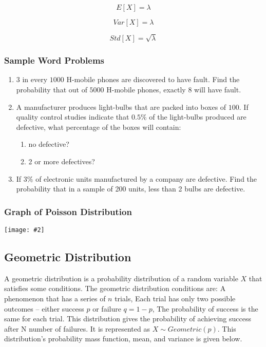 \documentclass[a4paper]{article}
\newcommand*{\newincludegraphics}[2][]{
    \begin{center}
        \begin{adjustbox}{max size={\textwidth}{\textheight}}
            \texttt{[image: \#2]}
        \end{adjustbox}
    \end{center}
}
\begin{document}
    \begin{equation}
        \label{eq:poisson_mean}
        E[X] = \lambda
    \end{equation}

    \begin{equation}
        \label{eq:poisson_variance}
        Var[X] = \lambda
    \end{equation}

    \begin{equation}
        \label{eq:poisson_std}
        Std[X] = \sqrt{\lambda}
    \end{equation}

    \subsubsection*{Sample Word Problems}
    \begin{enumerate}
        \item $3$ in every $1000$ H-mobile phones are discovered to have fault. Find the probability that out of $5000$ H-mobile phones, exactly 8 will have fault.
        \item A manufacturer produces light-bulbs that are packed into boxes of $100$. If quality control studies indicate that $0.5\%$ of the light-bulbs produced are defective, what percentage of the boxes will contain:
            \begin{enumerate}
                \item no defective?
                \item 2 or more defectives?
            \end{enumerate}
        \item If $3\%$ of electronic units manufactured by a company are defective. Find the probability that in a sample of 200 units, less than 2 bulbs are defective.
    \end{enumerate}

    \subsubsection*{Graph of Poisson Distribution}
    \newincludegraphics[]{(D)-Poisson_distribution_visualization}

    \subsection{Geometric Distribution}
    A geometric distribution is a probability distribution of a random variable $X$ that satisfies some conditions. The geometric distribution conditions are: A phenomenon that has a series of $n$ trials, Each trial has only two possible outcomes – either success $p$ or failure $q = 1-p$, The probability of success is the same for each trial. This distribution gives the probability of achieving success after N number of failures. It is represented as $X \sim Geometric(p)$. This distribution's probability mass function, mean, and variance is given below.
\end{document}
